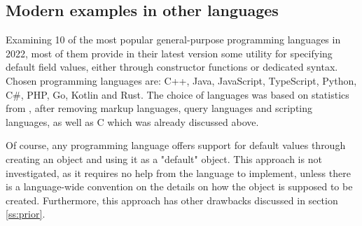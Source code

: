 \documentclass[en]{pracamgr}
\begin{document}
\subsection{Modern examples in other languages}\label{subs:modernexamples}
Examining 10 of the most popular general-purpose programming languages in 2022,
most of them provide in their latest version some utility for specifying default field values,
either through constructor functions or dedicated syntax.
Chosen programming languages are: C++, Java, JavaScript, TypeScript, Python, C\#, PHP, Go, Kotlin and Rust.
The choice of languages was based on statistics from \cite{StatistaProgLangs}, after removing markup languages, 
query languages and scripting languages, as well as C which was already discussed above.

Of course, any programming language offers support for default values through creating an object and using it as a "default" object.
This approach is not investigated, as it requires no help from the language to implement, unless there is a language-wide
convention on the details on how the object is supposed to be created. Furthermore, this approach has other drawbacks discussed in section \ref{ss:prior}.
\end{document}
